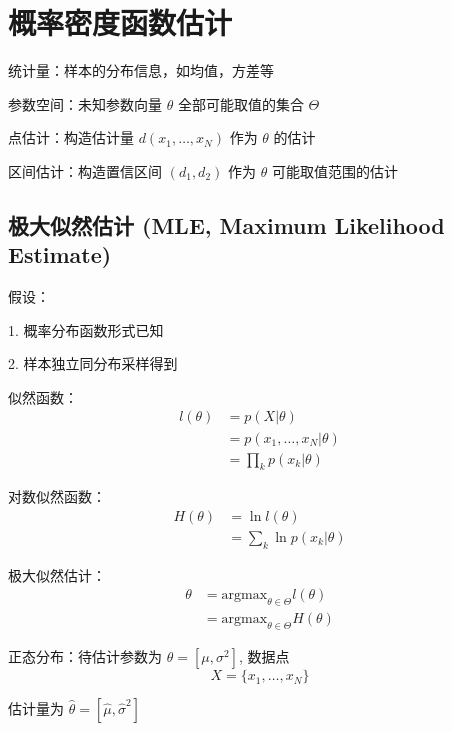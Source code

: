 \documentclass[openany]{ctexbook}
\theoremstyle{kaiti}
\theoremstyle{normal}
\begin{document}
\chapter{概率密度函数估计}

统计量：样本的分布信息，如均值，方差等

参数空间：未知参数向量 $\theta$ 全部可能取值的集合 $\Theta$

点估计：构造估计量 $d\left(x_1,\dots ,x_N \right)$ 作为 $\theta$ 的估计

区间估计：构造置信区间 $\left(d_1,d_2 \right)$ 作为 $\theta$ 可能取值范围的估计

\section{极大似然估计 (MLE, Maximum Likelihood Estimate) }

假设：

1. 概率分布函数形式已知

2. 样本独立同分布采样得到

似然函数：
\begin{equation}
\begin{aligned}
  l(\theta)
  &=p(X|\theta)\\
  &=p(x_1,\dots ,x_N|\theta)\\
  &=\prod_kp(x_k|\theta)
\end{aligned}
\end{equation}

对数似然函数：
\begin{equation}
\begin{aligned}
  H(\theta)
  &=\ln l(\theta)\\
  &=\sum_k\ln p(x_k|\theta)
\end{aligned}
\end{equation}

极大似然估计：
\begin{equation}
\begin{aligned}
  \theta 
  &=\mathrm{argmax}_{\theta\in\Theta} l(\theta)\\
  &=\mathrm{argmax}_{\theta\in\Theta} H(\theta)
\end{aligned}
\end{equation}

正态分布：待估计参数为 $\theta=[\mu,\sigma^2]$, 数据点 
\begin{equation}
X=\{ x_1,\dots,x_N\}
\end{equation}

估计量为 $\hat{\theta}=[\hat{\mu},\hat{\sigma}^2]$
\end{document}
